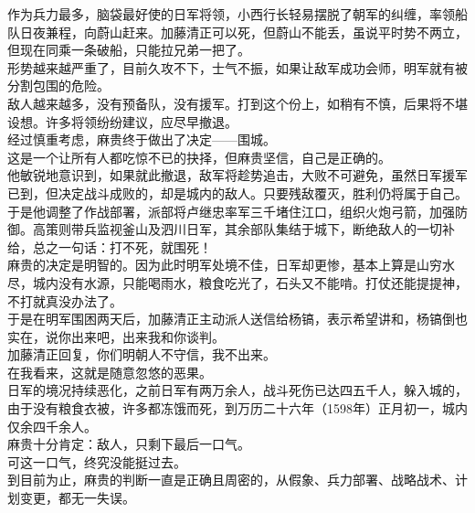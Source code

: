 \begin{multicols}{\theparacolNo}
作为兵力最多，脑袋最好使的日军将领，小西行长轻易摆脱了朝军的纠缠，率领船队日夜兼程，向蔚山赶来。加藤清正可以死，但蔚山不能丢，虽说平时势不两立，但现在同乘一条破船，只能拉兄弟一把了。\\

形势越来越严重了，目前久攻不下，士气不振，如果让敌军成功会师，明军就有被分割包围的危险。\\

敌人越来越多，没有预备队，没有援军。打到这个份上，如稍有不慎，后果将不堪设想。许多将领纷纷建议，应尽早撤退。\\

经过慎重考虑，麻贵终于做出了决定——围城。\\

这是一个让所有人都吃惊不已的抉择，但麻贵坚信，自己是正确的。\\

他敏锐地意识到，如果就此撤退，敌军将趁势追击，大败不可避免，虽然日军援军已到，但决定战斗成败的，却是城内的敌人。只要残敌覆灭，胜利仍将属于自己。\\

于是他调整了作战部署，派部将卢继忠率军三千堵住江口，组织火炮弓箭，加强防御。高策则带兵监视釜山及泗川日军，其余部队集结于城下，断绝敌人的一切补给，总之一句话：打不死，就围死！\\

麻贵的决定是明智的。因为此时明军处境不佳，日军却更惨，基本上算是山穷水尽，城内没有水源，只能喝雨水，粮食吃光了，石头又不能啃。打仗还能提提神，不打就真没办法了。\\

于是在明军围困两天后，加藤清正主动派人送信给杨镐，表示希望讲和，杨镐倒也实在，说你出来吧，出来我和你谈判。\\

加藤清正回复，你们明朝人不守信，我不出来。\\

在我看来，这就是随意忽悠的恶果。\\

日军的境况持续恶化，之前日军有两万余人，战斗死伤已达四五千人，躲入城的，由于没有粮食衣被，许多都冻饿而死，到万历二十六年（1598年）正月初一，城内仅余四千余人。\\

麻贵十分肯定：敌人，只剩下最后一口气。\\

可这一口气，终究没能挺过去。\\

到目前为止，麻贵的判断一直是正确且周密的，从假象、兵力部署、战略战术、计划变更，都无一失误。\\


\end{multicols}

